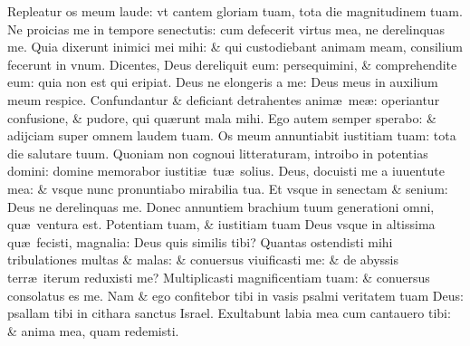 \documentclass[a5paper,10pt]{book}
\def\ae{æ}
\begin{document}
\begin{multicols*}{2}
\newline \color{red} R\color{black}epleatur os meum laude: vt cantem gloriam tuam, tota die magnitudinem tuam.
\newline \color{red} N\color{black}e proicias me in tempore senectutis: cum defecerit virtus mea, ne derelinquas me.
\newline \color{red} Q\color{black}uia dixerunt inimici mei mihi: \& qui custodiebant animam meam, consilium fecerunt in vnum.
\newline \color{red} D\color{black}icentes, Deus dereliquit eum: persequimini, \& comprehendite eum: quia non est qui eripiat.
\newline \color{red} D\color{black}eus ne elongeris a me: Deus meus in auxilium meum respice.
\newline \color{red} C\color{black}onfundantur \& deficiant detrahentes anim\ae \ me\ae : operiantur confusione, \& pudore, qui qu\ae runt mala mihi.
\newline \color{red} E\color{black}go autem semper sperabo: \& adijciam super omnem laudem tuam.
\newline \color{red} O\color{black}s meum annuntiabit iustitiam tuam: tota die salutare tuum.
\newline \color{red} Q\color{black}uoniam non cognoui litteraturam, introibo in potentias domini: domine memorabor iustiti\ae \ tu\ae \ solius.
\newline \color{red} D\color{black}eus, docuisti me a iuuentute mea: \& vsque nunc pronuntiabo mirabilia tua.
\newline \color{red} E\color{black}t vsque in senectam \& senium: Deus ne derelinquas me.
\newline \color{red} D\color{black}onec annuntiem brachium tuum generationi omni, qu\ae \ ventura est.
\newline \color{red} P\color{black}otentiam tuam, \& iustitiam tuam Deus vsque in altissima qu\ae \ fecisti, magnalia: Deus quis similis tibi?
\newline \color{red} Q\color{black}uantas ostendisti mihi tribulationes multas \& malas: \& conuersus viuificasti me: \& de abyssis terr\ae \ iterum reduxisti me?
\newline \color{red} M\color{black}ultiplicasti magnificentiam tuam: \& conuersus consolatus es me.
\newline \color{red} N\color{black}am \& ego confitebor tibi in vasis psalmi veritatem tuam Deus: psallam tibi in cithara sanctus Israel.
\newline \color{red} E\color{black}xultabunt labia mea cum cantauero tibi: \& anima mea, quam redemisti.

\end{multicols*}
\end{document}
